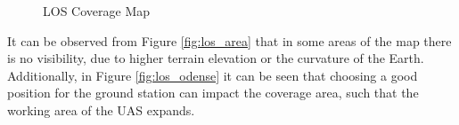 \begin{figure}[H]
  \hfill
  \hfill
  \hfill
  \caption{LOS Coverage Map}\label{fig:eu_map}
\end{figure}

It can be observed from Figure \ref{fig:los_area} that in some areas of the map there is no visibility, due to higher terrain elevation or the curvature of the Earth. Additionally, in Figure \ref{fig:los_odense} it can be seen that choosing a good position for the ground station can impact the coverage area, such that the working area of the UAS expands.  

